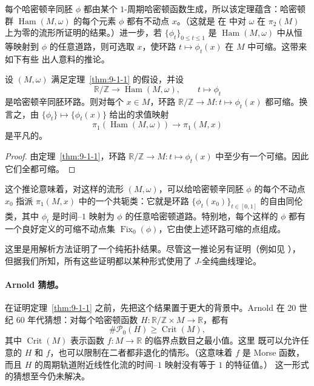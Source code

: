 每个哈密顿辛同胚 $\phi$ 都由某个 $1$-周期哈密顿函数生成，所以该定理蕴含：哈密顿群
$\operatorname{Ham}(M,\omega)$ 的每个元素 $\phi$ 都有不动点 $x$。（这就是
在  中对 $\omega$ 在
$\pi_2(M)$ 上为零的流形所证明的结果。）进一步，若
$\{\phi_t\}_{0\le t\le1}$ 是 $\operatorname{Ham}(M,\omega)$ 中从恒等映射到 $\phi$
的任意道路，则可选取 $x$，使环路 $t\mapsto\phi_t(x)$ 在 $M$ 中可缩。这带来如下有些
出人意料的推论。

\begin{corollary}\label{cor:9-1-2}
设 $(M,\omega)$ 满足定理~\ref{thm:9-1-1} 的假设，并设
\[
  \mathbb R/\mathbb Z\longrightarrow\operatorname{Ham}(M,\omega),
  \qquad t\longmapsto\phi_t
\]
是哈密顿辛同胚环路。则对每个 $x\in M$，环路
$\mathbb R/\mathbb Z\to M:t\mapsto\phi_t(x)$ 都可缩。换言之，由
$\{\phi_t\}\mapsto\{\phi_t(x)\}$ 给出的求值映射
\[
  \pi_1(\operatorname{Ham}(M,\omega))\longrightarrow\pi_1(M,x)
\]
是平凡的。
\end{corollary}

\begin{proof}
由定理~\ref{thm:9-1-1}，环路
$\mathbb R/\mathbb Z\to M:t\mapsto\phi_t(x)$ 中至少有一个可缩。因此它们全都可缩。
\end{proof}

这个推论意味着，对这样的流形 $(M,\omega)$，可以给哈密顿辛同胚 $\phi$ 的每个不动点
$x_0$ 指派 $\pi_1(M,x)$ 中的一个共轭类：它就是环路
$\{\phi_t(x_0)\}_{t\in[0,1]}$ 的自由同伦类，其中 $\phi_t$ 是时间--$1$ 映射为 $\phi$
的任意哈密顿道路。特别地，每个这样的 $\phi$ 都有一个良好定义的可缩不动点集
$\operatorname{Fix}_0(\phi)$，它由使上述环路可缩的点组成。

这里是用解析方法证明了一个纯拓扑结果。尽管这一推论另有证明（例如见 ），
但据我们所知，所有这些证明都以某种形式使用了 $J$-全纯曲线理论。

\paragraph{Arnold 猜想。}
在证明定理~\ref{thm:9-1-1} 之前，先把这个结果置于更大的背景中。Arnold
 在 20 世纪 60 年代猜想：对每个哈密顿函数
$H:\mathbb R/\mathbb Z\times M\to\mathbb R$，都有
\begin{equation}\label{eq:9-1-2}
  \#\mathcal P_0(H)\ge \operatorname{Crit}(M),
\end{equation}
其中 $\operatorname{Crit}(M)$ 表示函数 $f:M\to\mathbb R$ 的临界点数目之最小值。这里
既可以允许任意的 $H$ 和 $f$，也可以限制在二者都非退化的情形。（这意味着 $f$ 是
Morse 函数，而且 $H$ 的周期轨道附近线性化流的时间--$1$ 映射没有等于 $1$ 的特征值。）
这一形式的猜想至今仍未解决。

